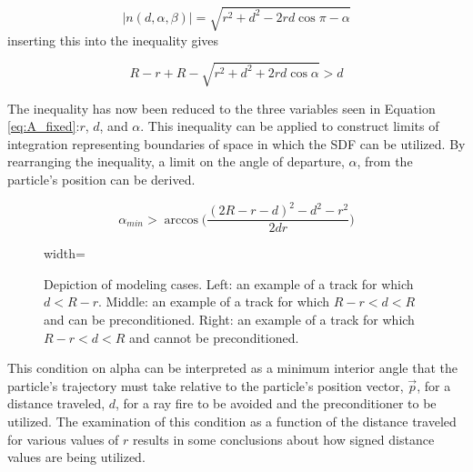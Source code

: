 \begin{equation}
|n(d,\alpha,\beta)| = \sqrt{r^2 + d^2 - 2rd \cos{\pi-\alpha}}
\end{equation}
inserting this into the inequality gives

\begin{equation}
R-r + R - \sqrt{r^2 + d^2 + 2rd \cos{\alpha}} > d
\end{equation}

The inequality has now been reduced to the three variables seen in
Equation \ref{eq:A_fixed}:$r$, $d$, and $\alpha$. This inequality can be applied to
construct limits of integration representing boundaries of space in which the
SDF can be utilized. By rearranging the inequality, a limit on the angle of
departure, $\alpha$, from the particle's position can be derived.

\begin{equation}
\alpha_{min} > \arccos\Bigg ( \frac{(2R-r-d)^2-d^2-r^2}{2 d r} \Bigg )
\end{equation}

\begin{figure}[ht]
  \centering
  {width=\textwidth}
  \caption{Depiction of modeling cases. Left: an example of a track for which
    $d < R - r$. Middle: an example of a track for which $R-r < d < R$ and can be
    preconditioned.  Right: an example of a track for which $R-r < d < R$ and
    cannot be preconditioned.}
  \label{fig:modeling_cases}
\end{figure}

This condition on alpha can be interpreted as a minimum interior angle that the
particle's trajectory must take relative to the particle's position vector,
$\vec{p}$, for a distance traveled, $d$, for a ray fire to be avoided and the
preconditioner to be utilized. The examination of this condition as a function
of the distance traveled for various values of $r$ results in some conclusions
about how signed distance values are being utilized.

